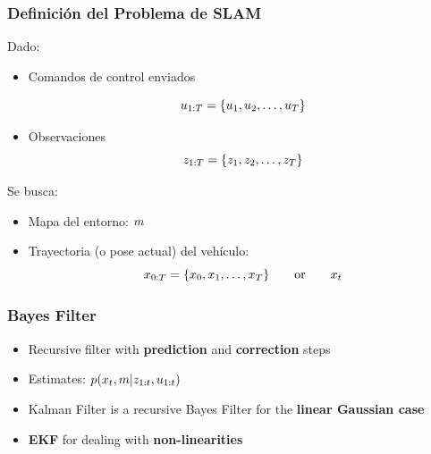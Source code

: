 \begin{frame}
    \frametitle{Definición del Problema de SLAM}

    Dado:
    \begin{itemize}
        \item Comandos de control enviados
        
        \begin{equation*}
            u_{1:T} = \{u_1, u_2, \ldots, u_T\}
        \end{equation*}
        \item Observaciones
        \begin{equation*}
            z_{1:T} = \{z_1, z_2, \ldots, z_T\}
        \end{equation*}
    \end{itemize}

    Se busca:
    \begin{itemize}
        \item Mapa del entorno: $m$
        \item Trayectoria (o pose actual) del vehículo:
        \begin{equation*}
            x_{0:T} = \{x_0, x_1, \ldots, x_T\} \qquad \text{or} \qquad x_{t}
        \end{equation*}
    \end{itemize}
\end{frame}

\begin{frame}
    \frametitle{Bayes Filter}

    \begin{itemize}
        \item Recursive filter with \textbf{prediction} and \textbf{correction} steps
        \item Estimates: $p(x_t, m | z_{1:t}, u_{1:t})$
        \item Kalman Filter is a recursive Bayes Filter for the \textbf{linear Gaussian case}
        \item \textbf{EKF} for dealing with \textbf{non-linearities}
    \end{itemize}
\end{frame}

